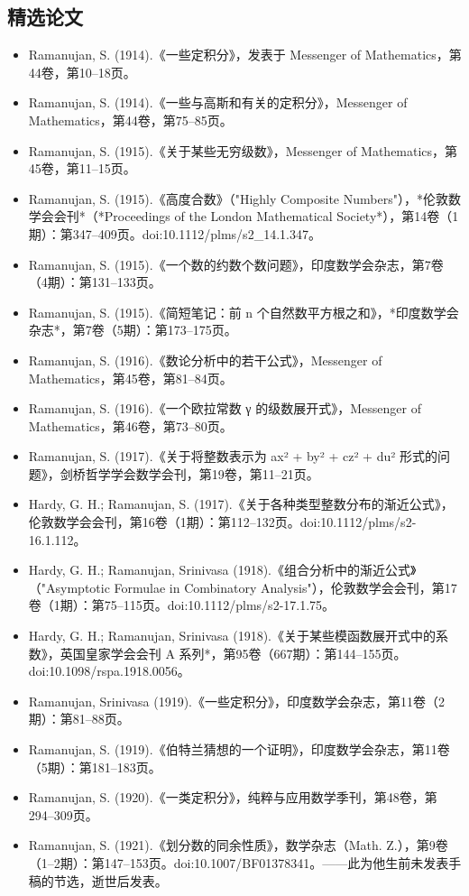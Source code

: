 \subsection{精选论文}
\begin{itemize}
\item Ramanujan, S. (1914).《一些定积分》，发表于 Messenger of Mathematics，第44卷，第10–18页。
\item Ramanujan, S. (1914).《一些与高斯和有关的定积分》，Messenger of Mathematics，第44卷，第75–85页。
\item Ramanujan, S. (1915).《关于某些无穷级数》，Messenger of Mathematics，第45卷，第11–15页。
\item Ramanujan, S. (1915).《高度合数》（"Highly Composite Numbers"），*伦敦数学会会刊*（*Proceedings of the London Mathematical Society*），第14卷（1期）：第347–409页。doi:10.1112/plms/s2\_14.1.347。
\item Ramanujan, S. (1915).《一个数的约数个数问题》，印度数学会杂志，第7卷（4期）：第131–133页。
\item Ramanujan, S. (1915).《简短笔记：前 n 个自然数平方根之和》，*印度数学会杂志*，第7卷（5期）：第173–175页。
\item Ramanujan, S. (1916).《数论分析中的若干公式》，Messenger of Mathematics，第45卷，第81–84页。
\item Ramanujan, S. (1916).《一个欧拉常数 γ 的级数展开式》，Messenger of Mathematics，第46卷，第73–80页。
\item Ramanujan, S. (1917).《关于将整数表示为 ax² + by² + cz² + du² 形式的问题》，剑桥哲学学会数学会刊，第19卷，第11–21页。
\item Hardy, G. H.; Ramanujan, S. (1917).《关于各种类型整数分布的渐近公式》，伦敦数学会会刊，第16卷（1期）：第112–132页。doi:10.1112/plms/s2-16.1.112。
\item Hardy, G. H.; Ramanujan, Srinivasa (1918).《组合分析中的渐近公式》（"Asymptotic Formulae in Combinatory Analysis"），伦敦数学会会刊，第17卷（1期）：第75–115页。doi:10.1112/plms/s2-17.1.75。
\item Hardy, G. H.; Ramanujan, Srinivasa (1918).《关于某些模函数展开式中的系数》，英国皇家学会会刊 A 系列*，第95卷（667期）：第144–155页。doi:10.1098/rspa.1918.0056。
\item Ramanujan, Srinivasa (1919).《一些定积分》，印度数学会杂志，第11卷（2期）：第81–88页。
\item Ramanujan, S. (1919).《伯特兰猜想的一个证明》，印度数学会杂志，第11卷（5期）：第181–183页。
\item Ramanujan, S. (1920).《一类定积分》，纯粹与应用数学季刊，第48卷，第294–309页。
\item Ramanujan, S. (1921).《划分数的同余性质》，数学杂志（Math. Z.），第9卷（1–2期）：第147–153页。doi:10.1007/BF01378341。——此为他生前未发表手稿的节选，逝世后发表。
\end{itemize}
